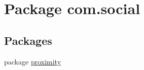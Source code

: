 \hypertarget{namespacecom_1_1social}{}\section{Package com.\+social}
\label{namespacecom_1_1social}
\subsection*{Packages}
\begin{DoxyCompactItemize}
\item 
package \hyperlink{namespacecom_1_1social_1_1proximity}{proximity}
\end{DoxyCompactItemize}
